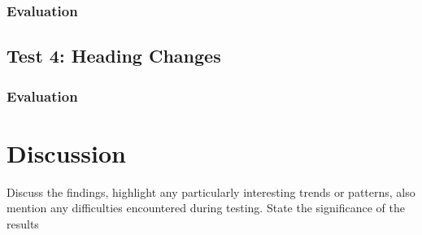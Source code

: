 \subsubsection{Evaluation}

\subsection{Test 4: Heading Changes}

\subsubsection{Evaluation}

\section{Discussion}
Discuss the findings, highlight any particularly interesting trends or patterns, also mention any difficulties encountered during testing. State the significance of the results